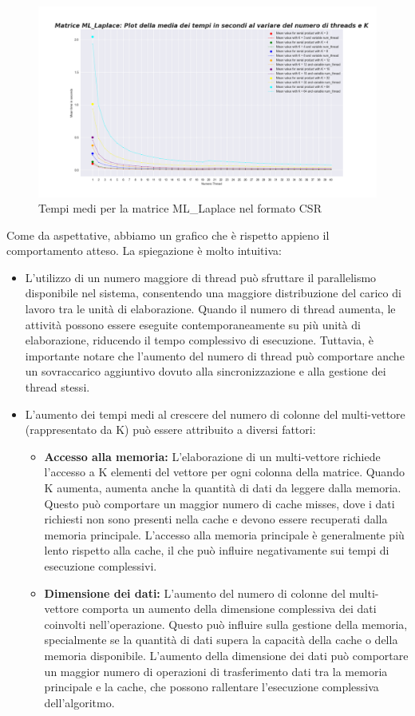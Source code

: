 \documentclass{article}
\begin{document}
\begin{figure}[H]
\centering
\includegraphics[width=\textwidth]{Immagini/CSR_CPU_ML_Laplace.png}
\caption{Tempi medi per la matrice ML\_Laplace nel formato CSR}
\end{figure}

Come da aspettative, abbiamo un grafico che è rispetto appieno il comportamento atteso. La spiegazione è molto intuitiva: 
\begin{itemize}
    \item  L'utilizzo di un numero maggiore di thread può sfruttare il parallelismo disponibile nel sistema, consentendo una maggiore distribuzione del carico di lavoro tra le unità di elaborazione. Quando il numero di thread aumenta, le attività possono essere eseguite contemporaneamente su più unità di elaborazione, riducendo il tempo complessivo di esecuzione. Tuttavia, è importante notare che l'aumento del numero di thread può comportare anche un sovraccarico aggiuntivo dovuto alla sincronizzazione e alla gestione dei thread stessi.
    \item L'aumento dei tempi medi al crescere del numero di colonne del multi-vettore (rappresentato da K) può essere attribuito a diversi fattori: 
    \begin{itemize}
        \item \textbf{Accesso alla memoria:} L'elaborazione di un multi-vettore richiede l'accesso a K elementi del vettore per ogni colonna della matrice. Quando K aumenta, aumenta anche la quantità di dati da leggere dalla memoria. Questo può comportare un maggior numero di cache misses, dove i dati richiesti non sono presenti nella cache e devono essere recuperati dalla memoria principale. L'accesso alla memoria principale è generalmente più lento rispetto alla cache, il che può influire negativamente sui tempi di esecuzione complessivi.
        \item \textbf{Dimensione dei dati:}  L'aumento del numero di colonne del multi-vettore comporta un aumento della dimensione complessiva dei dati coinvolti nell'operazione. Questo può influire sulla gestione della memoria, specialmente se la quantità di dati supera la capacità della cache o della memoria disponibile. L'aumento della dimensione dei dati può comportare un maggior numero di operazioni di trasferimento dati tra la memoria principale e la cache, che possono rallentare l'esecuzione complessiva dell'algoritmo.
    \end{itemize}
\end{itemize} 
\end{document}
